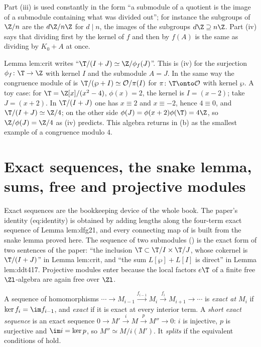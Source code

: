 Part (iii) is used constantly in the form ``a submodule of a quotient is the image of a submodule containing what was
divided out''; for instance the subgroups of $\Z/n$ are the $d\Z/n\Z$ for $d\mid n$, the images of the subgroups $d\Z\supseteq n\Z$.
Part (iv) says that dividing first by the kernel of $f$ and then by $f(A)$ is the same as dividing by $K_0+A$ at once.

\begin{paperlink}\label{pl:modules:iso}
Lemma lem:crit writes ``$\T/(I+J)\simeq\Z/\phi_f(J)$''. This is (iv) for the surjection
$\phi_f\colon\T\to\Z$ with kernel $I$ and the submodule $A=J$. In the same way the congruence module of
 is $\T/(\wp+I)\simeq\mathcal O/\pi(I)$ for $\pi\colon\T\onto\mathcal O$ with kernel $\wp$.
A toy case: for $\T=\Z[x]/(x^2-4)$, $\phi(x)=2$, the kernel is $I=(x-2)$; take $J=(x+2)$. In $\T/(I+J)$ one has $x\equiv2$ and
$x\equiv-2$, hence $4\equiv0$, and $\T/(I+J)\simeq\Z/4$; on the other side $\phi(J)=\phi(x+2)\phi(\T)=4\Z$, so $\Z/\phi(J)=\Z/4$ as
(iv) predicts. This algebra returns in (b) as the smallest example of a congruence modulo $4$.
\end{paperlink}

\section[Exact sequences; free and projective modules]{Exact sequences, the snake lemma, sums, free and projective modules}\label{sec:modules:exact}

Exact sequences are the bookkeeping device of the whole book. The paper's identity (eq:identity) is obtained by
adding lengths along the four-term exact sequence of Lemma lem:dfg21, and every connecting map of  is
built from the snake lemma proved here. The sequence of two submodules () is the exact
form of two sentences of the paper: ``the inclusion $\T\subset\T/I\times\T/J$, whose cokernel is $\T/(I+J)$'' in Lemma
lem:crit, and ``the sum $L[\wp]+L[I]$ is direct'' in Lemma lem:ddt417. Projective modules enter because the local factors
$e\T$ of a finite free $\Zl$-algebra are again free over $\Zl$.

\begin{definition}\label{def:modules:exact}
A sequence of homomorphisms $\cdots\to M_{i-1}\xrightarrow{f_{i-1}}M_i\xrightarrow{f_i}M_{i+1}\to\cdots$ is \emph{exact at $M_i$} if
$\ker f_i=\im f_{i-1}$, and \emph{exact} if it is exact at every interior term. A \emph{short exact sequence} is an exact
sequence $0\to M'\xrightarrow{i}M\xrightarrow{p}M''\to0$: $i$ is injective, $p$ is surjective and $\im i=\ker p$, so
$M''\simeq M/i(M')$. It \emph{splits} if the equivalent conditions of  hold.
\end{definition}

